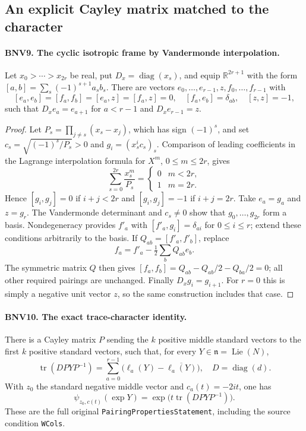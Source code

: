 \documentclass[11pt,a4paper]{article}
\numberwithin{equation}{section}
\theoremstyle{remark}\newtheorem{remark}[theorem]{Remark}
\begin{document}
\subsection{An explicit Cayley matrix matched to the character}

\paragraph{BNV9. The cyclic isotropic frame by Vandermonde interpolation.}
\label{claim:BNV9}
Let $x_0>\cdots>x_{2r}$ be real, put
$D_x=\operatorname{diag}(x_s)$, and equip $\mathbb R^{2r+1}$ with the form
$[a,b]=\sum_s(-1)^{s+1}a_sb_s$.  There are vectors
$e_0,\ldots,e_{r-1},z,f_0,\ldots,f_{r-1}$ with
\[
 [e_a,e_b]=[f_a,f_b]=[e_a,z]=[f_a,z]=0,\quad
 [f_a,e_b]=\delta_{ab},\quad [z,z]=-1,
\]
such that $D_xe_a=e_{a+1}$ for $a<r-1$ and $D_xe_{r-1}=z$.

\begin{proof}
Let $P_s=\prod_{j\ne s}(x_s-x_j)$, which has sign $(-1)^s$, and set
$c_s=\sqrt{(-1)^s/P_s}>0$ and $g_i=(x_s^ic_s)_s$.
Comparison of leading coefficients in the Lagrange interpolation formula
for $X^m$, $0\le m\le2r$, gives
\[
 \sum_{s=0}^{2r}\frac{x_s^m}{P_s}
 =\begin{cases}0&m<2r,\\1&m=2r.\end{cases}
\]
Hence $[g_i,g_j]=0$ if $i+j<2r$ and $[g_i,g_j]=-1$ if $i+j=2r$.
Take $e_a=g_a$ and $z=g_r$.  The Vandermonde determinant and $c_s\ne0$
show that $g_0,\ldots,g_{2r}$ form a basis.  Nondegeneracy provides
$f'_a$ with $[f'_a,g_i]=\delta_{ai}$ for $0\le i\le r$; extend these
conditions arbitrarily to the basis.  If $Q_{ab}=[f'_a,f'_b]$, replace
\[
 f_a=f'_a-\tfrac12\sum_b Q_{ab}e_b.
\]
The symmetric matrix $Q$ then gives $[f_a,f_b]=Q_{ab}-Q_{ab}/2-Q_{ba}/2=0$;
all other required pairings are unchanged.  Finally $D_xg_i=g_{i+1}$.
For $r=0$ this is simply a negative unit vector $z$, so the same
construction includes that case.
\end{proof}

\paragraph{BNV10. The exact trace-character identity.}
\label{claim:BNV10}
There is a Cayley matrix $P$ sending the $k$ positive middle standard
vectors to the first $k$ positive standard vectors, such that, for every
$Y\in\mathfrak n=\operatorname{Lie}(N)$,
\[
 \operatorname{tr}(D PYP^{-1})
 =\sum_{a=0}^{r-1}\bigl(\ell_a(Y)-\overline{\ell_a(Y)}\bigr),
 \quad D=\operatorname{diag}(d).
 \tag{BNV.15}
\]
With $z_0$ the standard negative middle vector and $c_a(t)=-2it$, one has
\[
 \psi_{z_0,c(t)}(\exp Y)
   =\exp\bigl(t\operatorname{tr}(D PYP^{-1})\bigr).
 \tag{BNV.16}
\]
These are the full original \texttt{Pairing\allowbreak Properties\allowbreak Statement}, including
the source condition \texttt{WCols}.
\end{document}
